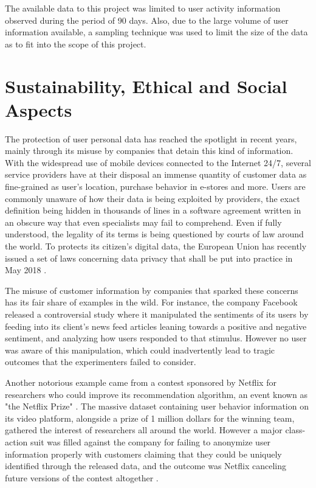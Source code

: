 \documentclass{kththesis}
\begin{document}
The available data to this project was limited to user activity information observed during the period of 90 days. Also, due to the large volume of user information available, a sampling technique was used to limit the size of the data as to fit into the scope of this project.

\section{Sustainability, Ethical and Social Aspects}

The protection of user personal data has reached the spotlight in recent years, mainly through its misuse by companies that detain this kind of information. With the widespread use of mobile devices connected to the Internet 24/7, several service providers have at their disposal an immense quantity of customer data as fine-grained as user's location, purchase behavior in e-stores and more. Users are commonly unaware of how their data is being exploited by providers, the exact definition being hidden in thousands of lines in a software agreement written in an obscure way that even specialists may fail to comprehend. Even if fully understood, the legality of its terms is being questioned by courts of law around the world. To protects its citizen's digital data, the European Union has recently issued a set of laws concerning data privacy that shall be put into practice in May 2018 \citep{eu2017protection}.

The misuse of customer information by companies that sparked these concerns has its fair share of examples in the wild. For instance, the company Facebook released a controversial study where it manipulated the sentiments of its users by feeding into its client's news feed articles leaning towards a positive and negative sentiment, and analyzing how users responded to that stimulus\citep{kramer2014experimental}. However no user was aware of this manipulation, which could inadvertently lead to tragic outcomes that the experimenters failed to consider. 

Another notorious example came from a contest sponsored by Netflix for researchers who could improve its recommendation algorithm, an event known as "the Netflix Prize" \citep{bennett2007netflix}. The massive dataset containing user behavior information on its video platform, alongside a prize of 1 million dollars for the winning team, gathered the interest of researchers all around the world. However a major class-action suit was filled against the company for failing to anonymize user information properly with customers claiming that they could be uniquely identified through the released data, and the outcome was Netflix canceling future versions of the contest altogether \citep{wired2010netflix}.
\end{document}
